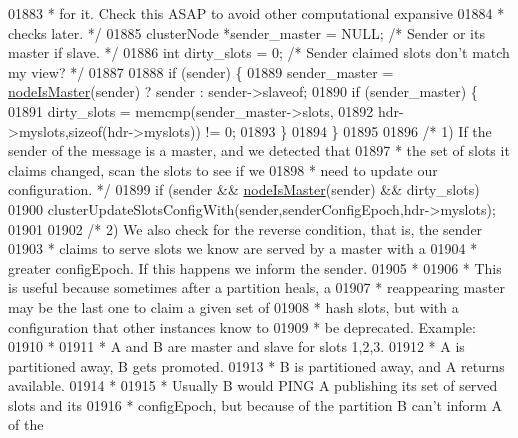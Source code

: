 \begin{DoxyCode}
{{{{{{{{{{{{{{{{{{{{{{{{{{{{{{01883 \textcolor{comment}{         * for it. Check this ASAP to avoid other computational expansive}
01884 \textcolor{comment}{         * checks later. */}
01885         clusterNode *sender\_master = NULL; \textcolor{comment}{/* Sender or its master if slave. */}
01886         \textcolor{keywordtype}{int} dirty\_slots = 0; \textcolor{comment}{/* Sender claimed slots don't match my view? */}
01887 
01888         \textcolor{keywordflow}{if} (sender) \{
01889             sender\_master = \hyperlink{cluster_8h_a2d8e84269474d8750565fb3fb67aa436}{nodeIsMaster}(sender) ? sender : sender->slaveof;
01890             \textcolor{keywordflow}{if} (sender\_master) \{
01891                 dirty\_slots = memcmp(sender\_master->slots,
01892                         hdr->myslots,\textcolor{keyword}{sizeof}(hdr->myslots)) != 0;
01893             \}
01894         \}
01895 
01896         \textcolor{comment}{/* 1) If the sender of the message is a master, and we detected that}
01897 \textcolor{comment}{         *    the set of slots it claims changed, scan the slots to see if we}
01898 \textcolor{comment}{         *    need to update our configuration. */}
01899         \textcolor{keywordflow}{if} (sender && \hyperlink{cluster_8h_a2d8e84269474d8750565fb3fb67aa436}{nodeIsMaster}(sender) && dirty\_slots)
01900             clusterUpdateSlotsConfigWith(sender,senderConfigEpoch,hdr->myslots);
01901 
01902         \textcolor{comment}{/* 2) We also check for the reverse condition, that is, the sender}
01903 \textcolor{comment}{         *    claims to serve slots we know are served by a master with a}
01904 \textcolor{comment}{         *    greater configEpoch. If this happens we inform the sender.}
01905 \textcolor{comment}{         *}
01906 \textcolor{comment}{         * This is useful because sometimes after a partition heals, a}
01907 \textcolor{comment}{         * reappearing master may be the last one to claim a given set of}
01908 \textcolor{comment}{         * hash slots, but with a configuration that other instances know to}
01909 \textcolor{comment}{         * be deprecated. Example:}
01910 \textcolor{comment}{         *}
01911 \textcolor{comment}{         * A and B are master and slave for slots 1,2,3.}
01912 \textcolor{comment}{         * A is partitioned away, B gets promoted.}
01913 \textcolor{comment}{         * B is partitioned away, and A returns available.}
01914 \textcolor{comment}{         *}
01915 \textcolor{comment}{         * Usually B would PING A publishing its set of served slots and its}
01916 \textcolor{comment}{         * configEpoch, but because of the partition B can't inform A of the}
}}}}}}}}}}}}}}}}}}}}}}}}}}}}}}
\end{DoxyCode}
